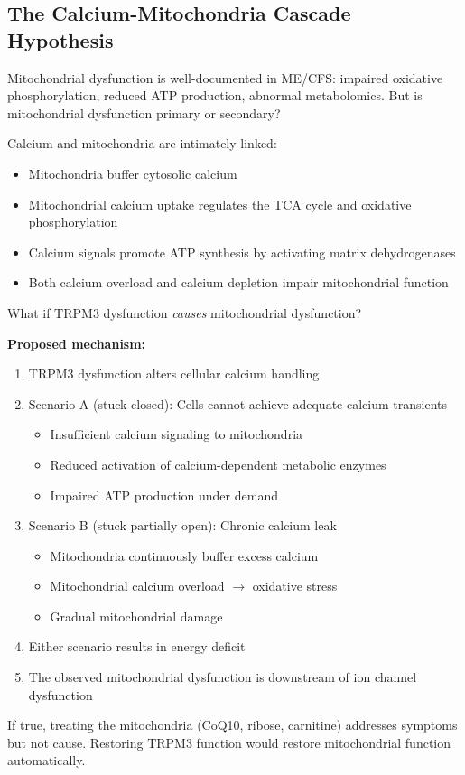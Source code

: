 \subsection{The Calcium-Mitochondria Cascade Hypothesis}

\begin{open_question}
Mitochondrial dysfunction is well-documented in ME/CFS: impaired oxidative phosphorylation, reduced ATP production, abnormal metabolomics. But is mitochondrial dysfunction primary or secondary?

Calcium and mitochondria are intimately linked:
\begin{itemize}
    \item Mitochondria buffer cytosolic calcium
    \item Mitochondrial calcium uptake regulates the TCA cycle and oxidative phosphorylation
    \item Calcium signals promote ATP synthesis by activating matrix dehydrogenases
    \item Both calcium overload and calcium depletion impair mitochondrial function
\end{itemize}

What if TRPM3 dysfunction \textit{causes} mitochondrial dysfunction?

\textbf{Proposed mechanism:}
\begin{enumerate}
    \item TRPM3 dysfunction alters cellular calcium handling
    \item Scenario A (stuck closed): Cells cannot achieve adequate calcium transients
    \begin{itemize}
        \item Insufficient calcium signaling to mitochondria
        \item Reduced activation of calcium-dependent metabolic enzymes
        \item Impaired ATP production under demand
    \end{itemize}
    \item Scenario B (stuck partially open): Chronic calcium leak
    \begin{itemize}
        \item Mitochondria continuously buffer excess calcium
        \item Mitochondrial calcium overload $\rightarrow$ oxidative stress
        \item Gradual mitochondrial damage
    \end{itemize}
    \item Either scenario results in energy deficit
    \item The observed mitochondrial dysfunction is downstream of ion channel dysfunction
\end{enumerate}

If true, treating the mitochondria (CoQ10, ribose, carnitine) addresses symptoms but not cause. Restoring TRPM3 function would restore mitochondrial function automatically.
\end{open_question}

